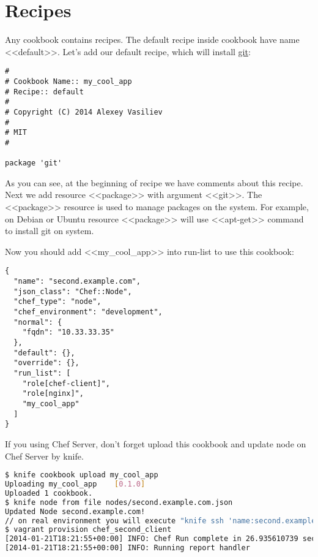 \section{Recipes}

Any cookbook contains recipes. The default recipe inside cookbook have name <<default>>. Let's add our default recipe, which will install \href{http://git-scm.com/}{git}:

\begin{lstlisting}[label=lst:cookbook-recipes1,title=my-server-cloud/site-cookbooks/my\_cool\_app/recipes/default.rb]
#
# Cookbook Name:: my_cool_app
# Recipe:: default
#
# Copyright (C) 2014 Alexey Vasiliev
#
# MIT
#

package 'git'
\end{lstlisting}

As you can see, at the beginning of recipe we have comments about this recipe. Next we add resource <<package>> with argument <<git>>. The <<package>> resource is used to manage packages on the system. For example, on Debian or Ubuntu resource <<package>> will use <<apt-get>> command to install git on system.

Now you should add <<my\_cool\_app>> into run-list to use this cookbook:

\begin{lstlisting}[label=lst:cookbook-recipes2,title=my-server-cloud/nodes/second.example.com.json]
{
  "name": "second.example.com",
  "json_class": "Chef::Node",
  "chef_type": "node",
  "chef_environment": "development",
  "normal": {
    "fqdn": "10.33.33.35"
  },
  "default": {},
  "override": {},
  "run_list": [
    "role[chef-client]",
    "role[nginx]",
    "my_cool_app"
  ]
}
\end{lstlisting}

If you using Chef Server, don't forget upload this cookbook and update node on Chef Server by knife.

\begin{lstlisting}[language=Bash,label=lst:cookbook-recipes3]
$ knife cookbook upload my_cool_app
Uploading my_cool_app    [0.1.0]
Uploaded 1 cookbook.
$ knife node from file nodes/second.example.com.json
Updated Node second.example.com!
// on real environment you will execute "knife ssh 'name:second.example.com' 'sudo chef-client' -i ../keys/production.pem -x ubuntu"
$ vagrant provision chef_second_client
[2014-01-21T18:21:55+00:00] INFO: Chef Run complete in 26.935610739 seconds
[2014-01-21T18:21:55+00:00] INFO: Running report handler
\end{lstlisting}


